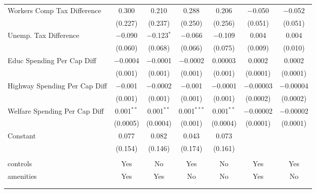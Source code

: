 \begin{table}[!htbp]
\begin{tabular}{@{\extracolsep{5pt}}lcccccc}
  Workers Comp Tax Difference & 0.300 & 0.210 & 0.288 & 0.206 & $-$0.050 & $-$0.052 \\ 
  & (0.227) & (0.237) & (0.250) & (0.256) & (0.051) & (0.051) \\ 
  Unemp. Tax Difference & $-$0.090 & $-$0.123$^{*}$ & $-$0.066 & $-$0.109 & 0.004 & 0.004 \\ 
  & (0.060) & (0.068) & (0.066) & (0.075) & (0.009) & (0.010) \\ 
  Educ Spending Per Cap Diff & $-$0.0004 & $-$0.0001 & $-$0.0002 & 0.00003 & 0.0002 & 0.0002 \\ 
  & (0.001) & (0.001) & (0.001) & (0.001) & (0.0001) & (0.0001) \\ 
  Highway Spending Per Cap Diff & $-$0.001 & $-$0.0002 & $-$0.001 & $-$0.0001 & $-$0.00003 & $-$0.00004 \\ 
  & (0.001) & (0.001) & (0.001) & (0.001) & (0.0002) & (0.0002) \\ 
  Welfare Spending Per Cap Diff & 0.001$^{**}$ & 0.001$^{**}$ & 0.001$^{***}$ & 0.001$^{**}$ & $-$0.00002 & $-$0.00002 \\ 
  & (0.0005) & (0.0004) & (0.001) & (0.0004) & (0.0001) & (0.0001) \\ 
  Constant & 0.077 & 0.082 & 0.043 & 0.073 &  &  \\ 
  & (0.154) & (0.146) & (0.174) & (0.161) &  &  \\ 
 \hline \\[-1.8ex] 
controls & Yes & No & Yes & No & Yes & Yes \\ 
amenities & Yes & Yes & No & No & Yes & No \\ 
\hline \\[-1.8ex] 
\hline 
\hline \\[-1.8ex] 
\end{tabular} 
\end{table} 
